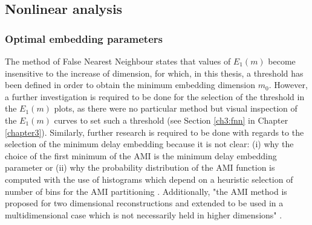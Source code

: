 %





\subsection*{Nonlinear analysis}

\subsubsection*{Optimal embedding parameters}
The method of False Nearest Neighbour \citep{Cao1997} states that 
values of $E_1(m)$ become insensitive to the increase of dimension, 
for which, in this thesis, a threshold has been defined in 
order to obtain the minimum embedding dimension $m_0$. 
However, a further investigation is required to be done for the 
selection of the threshold in the $E_1(m)$ plots, 
as there were no particular method 
but visual inspection of the $E_1(m)$ curves to set such a threshold 
(see Section \ref{ch3:fnn} in Chapter \ref{chapter3}).
Similarly, further research is required to be done with regards to the 
selection of the minimum delay embedding because it is not clear:
(i) why the choice of the first minimum of the AMI is the minimum delay 
embedding parameter \citep{kantz2003} or 
(ii) why the probability distribution of the AMI function 
is computed with the use of histograms which depend on a heuristic 
selection of number of bins for the AMI partitioning \citep{garcia2005e71}.
Additionally, "the AMI method is proposed for two dimensional 
reconstructions and extended to be used in a multidimensional case 
which is not necessarily held in higher dimensions" 
\citep[p. 156]{gomezgarcia2014}.

